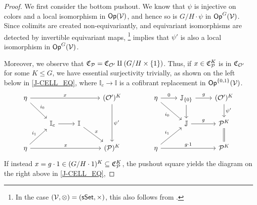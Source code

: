 \documentclass[a4paper,10pt
,draft
]{article}%
\renewcommand{\F}{\mathcal F}
\newcommand{\I}{\mathbb I}
\newcommand{\J}{\mathbb J}
\renewcommand{\1}{\eta}%
\begin{document}
\begin{proof}
      We first consider the bottom pushout.
      We know that $\psi$ is injective on colors and a local isomorphism in $\Op(\V)$,
      and hence so is $G/H \cdot \psi$ in $\Op^G(\V)$.
      Since colimits are created non-equivariantly, and equivariant isomorphisms are detected by invertible equivariant maps,
      \cite[Prop B.22]{Cav} \footnote{
        In the case $(\V, \otimes) = (\sSet, \times)$, this also follows from \cite[Prop. 1.28]{CM13b}.}
      implies that $\psi'$ is also a local isomorphism in $\Op^G(\V)$.
      
      Moreover, we observe that $\C_{\P} = \C_{\O'} \amalg (G/H \times \set{1})$.
      Thus, if $x \in \C_{\P}^K$ is in $\C_{\O'}$ for some $K \leq G$, we have essential surjectivity trivially,
      as shown on the left below in \eqref{J-CELL_EQ},
      where $\I_c \to \I$ is a cofibrant replacement in $\Op^{\set{0,1}}(\V)$.
      \begin{equation}
            \label{J-CELL_EQ}
            \begin{tikzcd}
                  \1 \arrow[rrr, "x"] \arrow[dr, " i_0"]
                  &&&
                  (\O')^K \arrow[dd, "\psi'"]
                  &[15pt] %
                  \1 \arrow[r, "0"] \arrow[dr, "i_0"']
                  &
                  \J_{\set{0}} \arrow[d] \arrow[r, "g"]
                  &
                  (\O')^K \arrow[d, "{\psi'}"]
                  \\
                  &
                  \I_c \arrow[r]
                  &
                  \I \arrow[dr, "x"]
                  &
                  & %
                  &
                  \J \arrow[r, "g"]
                  &
                  \P^K \arrow[d, equal]
                  \\
                  \1 \arrow[ur, " i_1"] \arrow[rrr,"x"]
                  &&&
                  (\P)^K
                  & %
                  \1 \arrow[rr, "g \cdot 1"] \arrow[ur, "i_1"]
                  &&
                  \P^K
            \end{tikzcd}
      \end{equation}
      If instead $x  = g \cdot 1 \in (G/H \cdot 1)^K \subseteq \mathfrak C_\P^K$,
      the pushout square yields the diagram on the right above in \eqref{J-CELL_EQ},

\end{proof}
\end{document}
